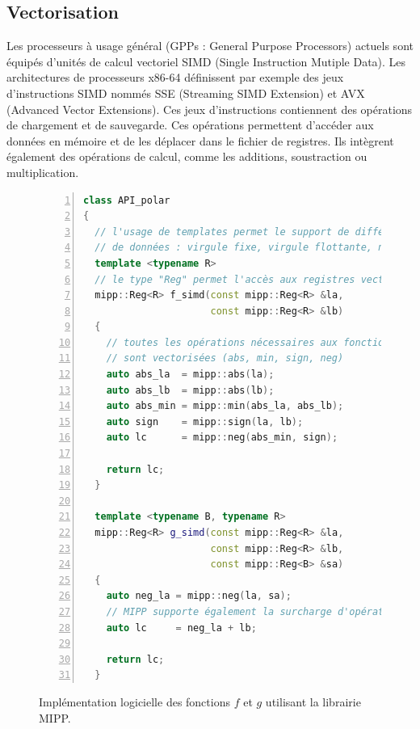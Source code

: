 \subsection{Vectorisation}


Les processeurs à usage général (GPPs : General Purpose Processors) actuels sont équipés d'unités de calcul vectoriel SIMD (Single Instruction Mutiple Data). Les architectures de processeurs x86-64 définissent par exemple des jeux d'instructions SIMD nommés SSE (Streaming SIMD Extension) et AVX (Advanced Vector Extensions). Ces jeux d'instructions contiennent des opérations de chargement et de sauvegarde. Ces opérations permettent d'accéder aux données en mémoire et de les déplacer dans le fichier de registres. Ils intègrent également des opérations de calcul, comme les additions, soustraction ou multiplication.
\begin{figure}[htp]
\begin{lstlisting}[language=C++, numbers=left, numbersep=0.3em, tabsize=2, basicstyle=\footnotesize\ttfamily]
class API_polar
{
  // l'usage de templates permet le support de différents formats
  // de données : virgule fixe, virgule flottante, nombre de bits
  template <typename R>
  // le type "Reg" permet l'accès aux registres vectoriels
  mipp::Reg<R> f_simd(const mipp::Reg<R> &la,
                      const mipp::Reg<R> &lb)
  {
    // toutes les opérations nécessaires aux fonctions polaires
    // sont vectorisées (abs, min, sign, neg)
    auto abs_la  = mipp::abs(la);
    auto abs_lb  = mipp::abs(lb);
    auto abs_min = mipp::min(abs_la, abs_lb);
    auto sign    = mipp::sign(la, lb);
    auto lc      = mipp::neg(abs_min, sign);

    return lc;
  }

  template <typename B, typename R>
  mipp::Reg<R> g_simd(const mipp::Reg<R> &la,
                      const mipp::Reg<R> &lb,
                      const mipp::Reg<B> &sa)
  {
    auto neg_la = mipp::neg(la, sa);
    // MIPP supporte également la surcharge d'opérateurs
    auto lc     = neg_la + lb;

    return lc;
  }

  \end{lstlisting}
  \caption{Implémentation logicielle des fonctions $f$ et $g$ utilisant la librairie MIPP.}
  \label{fig:mipp}
  \end{figure}

